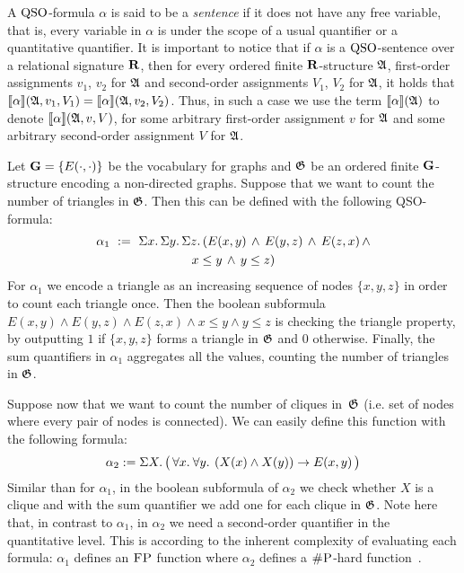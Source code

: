 A ${\rm QSO}$-formula $\alpha$ is said to be a \emph{sentence} if it does not have any free variable, that is, every variable in $\alpha$ is under the scope of a usual quantifier or a quantitative quantifier. It is important to notice that if $\alpha$ is a ${\rm QSO}$-sentence over a relational signature $\mathbf{R}$, then for every ordered finite $\mathbf{R}$-structure $\mathfrak{A}$, first-order assignments $v_1$, $v_2$ for $\mathfrak{A}$ and second-order assignments $V_1$, $V_2$ for $\mathfrak{A}$, it holds that ${\llbracket{}{\alpha}\rrbracket}(\mathfrak{A}, v_1, V_1) = {\llbracket{}{\alpha}\rrbracket}(\mathfrak{A}, v_2, V_2)$.
Thus, in such a case we use the term ${\llbracket{}{\alpha}\rrbracket}(\mathfrak{A})$ to denote ${\llbracket{}{\alpha}\rrbracket}(\mathfrak{A}, v, V)$, for some arbitrary first-order assignment $v$ for $\mathfrak{A}$ and some arbitrary second-order assignment $V$ for $\mathfrak{A}$. 
\begin{example}\label{ex:cliques}
Let $\mathbf{G} = \{E(\cdot,\cdot)\}$ be the vocabulary for graphs and $\mathfrak{G}$ be an ordered finite $\mathbf{G}$-structure encoding a non-directed graphs. 
Suppose that we want to count the number of triangles in $\mathfrak{G}$. Then this can be defined with the following QSO-formula:
\begin{multline*}
\alpha_1 \ := \ \Sigma{x}.\, \Sigma{y}.\, \Sigma{z}.\, ( E(x,y) \, \wedge \, E(y,z) \, \wedge \, E(z,x) \, \wedge \\
x \leq y \, \wedge \, y \leq z )
\end{multline*}
For $\alpha_1$ we encode a triangle as an increasing sequence of nodes $\{x, y, z\}$ in order to count each triangle once. Then the boolean subformula  $E(x,y) \wedge E(y,z) \wedge E(z,x) \wedge
x \leq y \wedge y \leq z$ is checking the triangle property, by outputting $1$ if $\{x, y, z\}$ forms a triangle in $\mathfrak{G}$ and $0$ otherwise.
Finally, the sum quantifiers in $\alpha_1$ aggregates all the values, counting the number of triangles in $\mathfrak{G}$.

Suppose now that we want to count the number of cliques in~$\mathfrak{G}$ (i.e. set of nodes where every pair of nodes is connected). We can easily define this function with the following formula:
$$
\alpha_2 := \Sigma{X}.\, \big( \, \forall{x}.\: \forall{y}.\: \left(X(x) \wedge X(y)\right) \rightarrow E(x,y) \, \big)  
$$ 
Similar than for $\alpha_1$, in the boolean subformula of $\alpha_2$ we check whether $X$ is a clique and with the sum quantifier we add one for each clique in $\mathfrak{G}$. 
Note here that, in contrast to $\alpha_1$, in $\alpha_2$ we need a second-order quantifier in the quantitative level.
This is according to the inherent complexity of evaluating each formula: $\alpha_1$ defines an $\text{\sc FP}$ function where $\alpha_2$ defines a $\text{\sc \#P}$-hard function~\cite{paper-that-shows-that-this-problem-is-sharpP-hard}.
\end{example}

